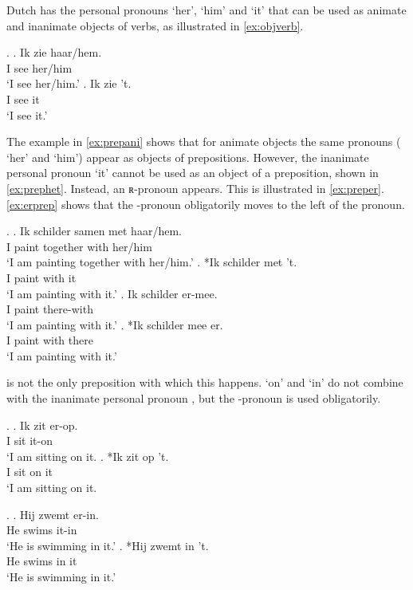 \documentclass{article}
\begin{document}
Dutch has the personal pronouns  `her',  `him' and  `it' that can be used as animate and inanimate objects of verbs, as illustrated in \ref{ex:objverb}.

 \ex. \label{ex:objverb}
 \ag. Ik zie haar/hem.\\
  I see her/him\\
  `I see her/him.'\label{ex:aniobj}
 \bg. Ik zie 't.\\
  I see it\\
  `I see it.'\label{ex:inaniobj}

The example in \ref{ex:prepani} shows that for animate objects the same pronouns ( `her' and  `him') appear as objects of prepositions. However, the inanimate personal pronoun  `it' cannot be used as an object of a preposition, shown in \ref{ex:prephet}. Instead, an ʀ-pronoun appears. This is illustrated in \ref{ex:preper}. \ref{ex:erprep} shows that the -pronoun obligatorily moves to the left of the pronoun.

\ex. \label{ex:objprep}
\ag. Ik schilder samen met haar/hem.\\
 I paint together with her/him\\
 `I am painting together with her/him.'\label{ex:prepani}
\bg. *Ik schilder met 't.\\
 I paint with it\\
 `I am painting with it.'\label{ex:prephet}
\bg. Ik schilder er-mee.\\
 I paint there-with\\
 `I am painting with it.'\label{ex:preper}
\bg. *Ik schilder mee er.\\
 I paint with there\\
 `I am painting with it.'\label{ex:erprep}

 is not the only preposition with which this happens.  `on' and  `in' do not combine with the inanimate personal pronoun , but the -pronoun is used obligatorily.

\ex.
\ag. Ik zit er-op.\\
 I sit it-on\\
 `I am sitting on it.
\bg. *Ik zit op 't.\\
 I sit on it\\
 `I am sitting on it.

\ex.
 \ag. Hij zwemt er-in.\\
  He swims it-in\\
  `He is swimming in it.'
 \bg. *Hij zwemt in 't.\\
  He swims in it\\
  `He is swimming in it.'
\end{document}
